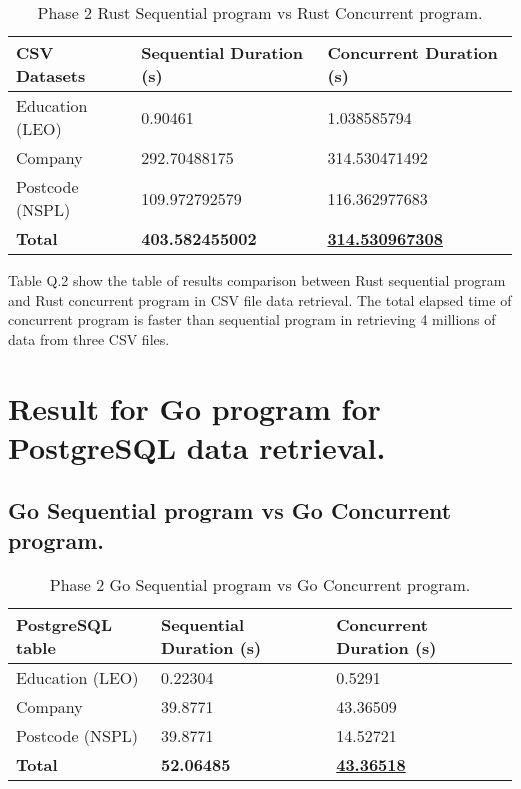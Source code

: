 \begin{table}[H]
	\centering
	\begin{tabulary}{1.0\textwidth}{|L|L|L|}
		\hline
		{\bf{CSV Datasets}} & {\bf Sequential Duration (s)} & {\bf Concurrent Duration (s)}  \\ \hline
		Education (LEO)		& 0.90461     			  		& 1.038585794                    	 \\ \hline
		Company				& 292.70488175    				& 314.530471492                       \\ \hline
		Postcode (NSPL) 	& 109.972792579       			& 116.362977683                       \\ \hline
		\bf{Total}   		& \textbf{403.582455002}  			& \bf{\underline{314.530967308}}       \\ \hline
	\end{tabulary}
	\caption{Phase 2 Rust Sequential program vs Rust Concurrent program.}
\end{table}

Table Q.2 show the table of results comparison between Rust sequential program and Rust concurrent program in CSV file data retrieval. The total elapsed time of concurrent program is faster than sequential program in retrieving 4 millions of data from three CSV files.

\newpage

\section{Result for Go program for PostgreSQL data retrieval.}

\subsection{Go Sequential program vs Go Concurrent program.}

\begin{table}[H]
	\centering
	\begin{tabulary}{1.0\textwidth}{|L|L|L|}
		\hline
		{\bf{PostgreSQL table}} & {\bf Sequential Duration (s)} & {\bf Concurrent Duration (s)}  \\ \hline
		Education (LEO)		& 0.22304     			  		& 0.5291                    	 \\ \hline
		Company				& 39.8771    					& 43.36509                      \\ \hline
		Postcode (NSPL) 	& 39.8771       				& 14.52721                       \\ \hline
		\bf{Total}   		& \textbf{52.06485}  			& \bf{\underline{43.36518}}       \\ \hline
	\end{tabulary}
	\caption{Phase 2 Go Sequential program vs Go Concurrent program.}
\end{table}

